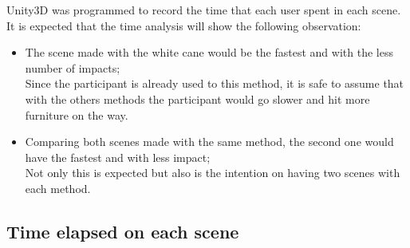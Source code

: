 %

Unity3D was programmed to record the time that each user spent in each scene. It is expected that the time analysis will show the following observation:

\begin{itemize}
    \item The scene made with the white cane would be the fastest and with the less number of impacts; \\ 
    Since the participant is already used to this method, it is safe to assume that with the others methods the participant would go slower and hit more furniture on the way.
    \item Comparing both scenes made with the same method, the second one would have the fastest and with less impact; \\
    Not only this is expected but also is the intention on having two scenes with each method.
\end{itemize}

\subsection{Time elapsed on each scene}
\label{subsec:results_collsions}




